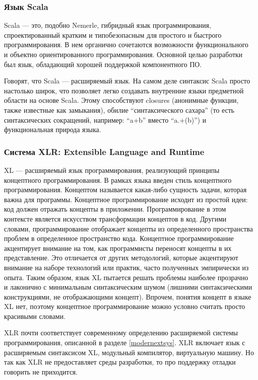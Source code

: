 \documentclass[a4paper,12pt,titlepage]{extarticle}
\begin{document}
\subsubsection*{Язык Scala}
Scala — это, подобно Nemerle, гибридный язык программирования, спроектированный
кратким и типобезопасным для простого и быстрого программирования. В нем органично
сочетаются возможности функционального и объектно ориентированного
программирования. Основной целью разработки был язык, обладающий хорошей
поддержкой компонентного ПО.

Говорят, что Scala --- расширяемый язык. На самом деле синтаксис Scala просто
настолько широк, что позволяет легко создавать внутренние языки предметной
области на основе Scala. Этому способствуют closures (анонимные функции, также
известные как замыкания), обилие ``синтаксического сахара'' (то есть
синтаксических сокращений, например: ``a+b'' вместо ``a.+(b)'') и
функциональная природа языка.

\subsubsection*{Система XLR: Extensible Language and Runtime}
\label{xlr}
XL --- расширяемый язык программирования, реализующий принципы концептного
программирования. В рамках языка введен стиль концептного программирования.
Концептом называется какая-либо сущность задачи, которая важна для программы.
Концептное программирование исходит из простой идеи: код должен отражать концепты в приложении.
Программирование в этом контексте является искусством трансформации концептов в
код. Другими словами, программирование отображает концепты из определенного
пространства проблем в определенное пространство кода. Концептное
программирование акцентирует внимание на том, как программисты переносят
концепты в их представление. Это отличается от других методологий, которые
акцентируют внимание на наборе технологий или практик, часто полученных
эмпирически из опыта. Таким образом, язык XL пытается решать проблемы наиболее прозрачно и лаконично
с минимальным синтаксическим шумом (лишними синтаксическими конструкциями, не
отображающими концепт). Впрочем, понятия концепт в языке XL нет, поэтому
концептное программирование можно условно считать просто красивыми словами.

XLR почти соответствует современному определению расширяемой системы
программирования, описанной в разделе \ref{modernextsys}. XLR включает язык с
расширяемым синтаксисом XL, модульный компилятор, виртуальную машину. Но так как
XLR не предоставляет среды разработки, то про поддержку отладки говорить не
приходится.
\end{document}

